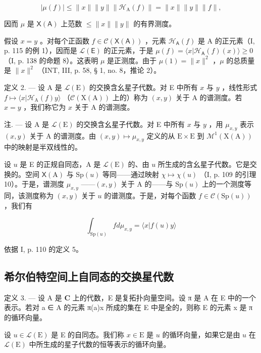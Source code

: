 \[
| \mu (f) | \leqslant \| x \| \| y \| \| \mathcal {H} _ {\mathrm{A}} (f) \| = \| x \| \| y \| \| f \|,
\]

因而 \(\mu\) 是 \(\mathsf{X}(\mathsf{A})\) 上范数 \(\leqslant \| x\|\| y\|\) 的有界测度。

假设 \(x = y\) 。对每个正函数 \(f \in \mathcal{C}(\mathsf{X}(\mathsf{A}))\) ，元素 \(\mathcal{H}_{\mathsf{A}}(f)\) 是 A 的正元素（I, p. 115 的例 1），因而是 \(\mathcal{L}(\mathsf{E})\) 的正元素，于是 \(\mu(f) = \langle x | \mathcal{H}_{\mathsf{A}}(f)(x) \rangle \geqslant 0\) （I, p. 138 的命题 8）。这表明 \(\mu\) 是正测度。由于 \(\mu(1) = \|x\|^2\) ，\(\mu\) 的总质量是 \(\|x\|^2\) （INT, III, p. 58, § 1, no. 8，推论 2）。

定义 2. --- 设 A 是 \(\mathcal{L}(\mathrm{E})\) 的交换含幺星子代数。对 E 中所有 \(x\) 与 \(y\) ，线性形式 \(f \mapsto \langle x | \mathcal{H}_{\mathrm{A}}(f)y \rangle\) （\(\mathcal{C}(\mathrm{X}(\mathrm{A}))\) 上的）称为 \((x,y)\) 关于 A 的谱测度。若 \(x = y\) ，我们称它为 \(x\) 关于 A 的谱测度。

注. --- 设 A 是 \(\mathcal{L}(\mathrm{E})\) 的交换含幺星子代数。对 E 中所有 \(x\) 与 \(y\) ，用 \(\mu_{x,y}\) 表示 \((x,y)\) 关于 A 的谱测度。由 \((x,y) \mapsto \mu_{x,y}\) 定义的从 \(\mathrm{E} \times \mathrm{E}\) 到 \(\mathcal{M}^1(\mathrm{X}(\mathrm{A}))\) 中的映射是半双线性的。

设 \(u\) 是 E 的正规自同态，A 是 \(\mathcal{L}(\mathrm{E})\) 的、由 \(u\) 所生成的含幺星子代数。它是交换的。空间 \(\mathsf{X}(\mathrm{A})\) 与 \(\mathrm{Sp}(u)\) 等同——通过映射 \(\chi \mapsto \chi(u)\) （I, p. 109 的引理 10）。于是，谱测度 \(\mu_{x,y}\) ——\((x,y)\) 关于 A 的——与 \(\mathrm{Sp}(u)\) 上的一个测度等同，该测度称为 \((x,y)\) 关于 \(u\) 的谱测度。于是，对每个函数 \(f \in \mathcal{C}(\mathrm{Sp}(u))\) ，我们有

\[
\int_ {\mathrm{Sp} (u)} f d \mu_ {x, y} = \langle x | f (u) y \rangle
\]

依据 I, p. 110 的定义 5。

\subsection{希尔伯特空间上自同态的交换星代数}

定义 3. --- 设 A 是 \(\mathbf{C}\) 上的代数，E 是复拓扑向量空间。设 π 是 A 在 E 中的一个表示。若对 a ∈ A 的元素 π(a)x 所成的集在 E 中是全的，则称 E 的元素 x 是 π 的循环向量。

设 \(u \in \mathcal{L}(\mathrm{E})\) 是 E 的自同态。我们称 \(x \in \mathrm{E}\) 是 \(u\) 的循环向量，如果它是由 \(u\) 在 \(\mathcal{L}(\mathrm{E})\) 中所生成的星子代数的恒等表示的循环向量。


